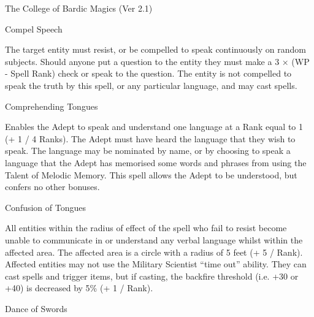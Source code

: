 \begin{Chapter}{The College of Bardic Magics (Ver 2.1)}
\begin{spell}[S-2]{Compel Speech}

\begin{effects}
The target entity must resist, or be compelled to speak continuously
on random subjects.  Should anyone put a question to the entity they
must make a 3 × (WP - Spell Rank) check or speak to the question.  The
entity is not compelled to speak the truth by this spell, or any
particular language, and may cast spells.
\end{effects}
\end{spell}

\begin{spell}[S-3]{Comprehending Tongues}

\begin{effects}
Enables the Adept to speak and understand one language at a Rank equal
to 1 (+ 1 / 4 Ranks).  The Adept must have heard the language that
they wish to speak. The language may be nominated by name, or by
choosing to speak a language that the Adept has memorised some words
and phrases from using the Talent of Melodic Memory.  This spell
allows the Adept to be understood, but confers no other bonuses.
\end{effects}
\end{spell}

\begin{spell}[S-4]{Confusion of Tongues}

\begin{effects}
All entities within the radius of effect of the spell who fail to
resist become unable to communicate in or understand any verbal
language whilst within the affected area. The affected area is a
circle with a radius of 5 feet (+ 5 / Rank).  Affected entities may
not use the Military Scientist “time out” ability. They can cast
spells and trigger items, but if casting, the backfire threshold (i.e.
+30 or +40) is decreased by 5\% (+ 1 / Rank).
\end{effects}
\end{spell}

\begin{spell}[S-5]{Dance of Swords}


\end{spell}
\end{Chapter}
